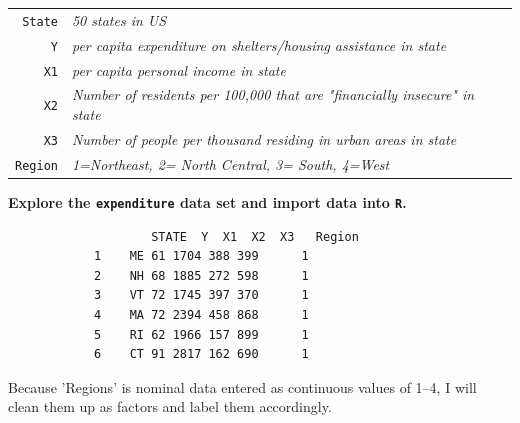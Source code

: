 \documentclass[12pt,letterpaper]{article}
\begin{document}
\begin{tabular}{r|l}
	\texttt{State} &\emph{50 states in US} \\
	\texttt{Y} & \emph{per capita expenditure on shelters/housing assistance in state}\\
	\texttt{X1} &\emph{per capita personal income in state} \\
	\texttt{X2} &  \emph{Number of residents per 100,000 that are "financially insecure" in state}\\
	\texttt{X3} &  \emph{Number of people per thousand residing in urban areas in state} \\
	\texttt{Region} &  \emph{1=Northeast, 2= North Central, 3= South, 4=West} \\
\end{tabular}

\vspace{.5cm}
\noindent \textbf{Explore the \texttt{expenditure} data set and import data into \texttt{R}.}
\vspace{.5cm}
  

\begin{verbatim}
					STATE  Y  X1  X2  X3   Region
			1    ME 61 1704 388 399      1
			2    NH 68 1885 272 598      1
			3    VT 72 1745 397 370      1
			4    MA 72 2394 458 868      1
			5    RI 62 1966 157 899      1
			6    CT 91 2817 162 690      1
\end{verbatim}
\vspace{.5cm}

\noindent Because 'Regions' is nominal data entered as continuous values of 1–4, I will clean them up as factors and label them accordingly.


\end{document}
